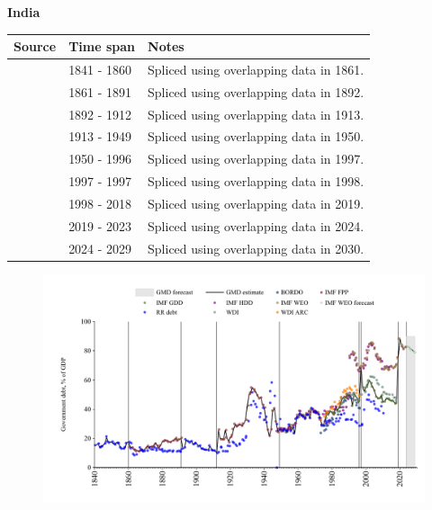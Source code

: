 \documentclass[12pt,a4paper,landscape]{article}
\begin{document}
\begin{adjustbox}{max totalsize={\paperwidth}{\paperheight},center}
\begin{minipage}[t][\textheight][t]{\textwidth}
\vspace*{0.5cm}
{}
\begin{center}
{\Large\bfseries India}
\end{center}
\vspace{0.5cm}
\begin{table}[H]
\centering
\small
\begin{tabular}{|l|l|l|}
\hline
\textbf{Source} & \textbf{Time span} & \textbf{Notes} \\
\hline
\rowcolor{white}\cite{RR_debt}& 1841 - 1860 &Spliced using overlapping data in 1861.\\
\rowcolor{lightgray}\cite{IMF_FPP}& 1861 - 1891 &Spliced using overlapping data in 1892.\\
\rowcolor{white}\cite{RR_debt}& 1892 - 1912 &Spliced using overlapping data in 1913.\\
\rowcolor{lightgray}\cite{IMF_FPP}& 1913 - 1949 &Spliced using overlapping data in 1950.\\
\rowcolor{white}\cite{IMF_GDD}& 1950 - 1996 &Spliced using overlapping data in 1997.\\
\rowcolor{lightgray}\cite{IMF_FPP}& 1997 - 1997 &Spliced using overlapping data in 1998.\\
\rowcolor{white}\cite{IMF_GDD}& 1998 - 2018 &Spliced using overlapping data in 2019.\\
\rowcolor{lightgray}\cite{IMF_FPP}& 2019 - 2023 &Spliced using overlapping data in 2024.\\
\rowcolor{white}\cite{IMF_WEO_forecast}& 2024 - 2029 &Spliced using overlapping data in 2030.\\
\hline
\end{tabular}
\end{table}
\begin{figure}[H]
\centering
\includegraphics[width=\textwidth,height=0.6\textheight,keepaspectratio]{graphs/IND_govdebt_GDP.pdf}
\end{figure}
\end{minipage}
\end{adjustbox}
\end{document}
